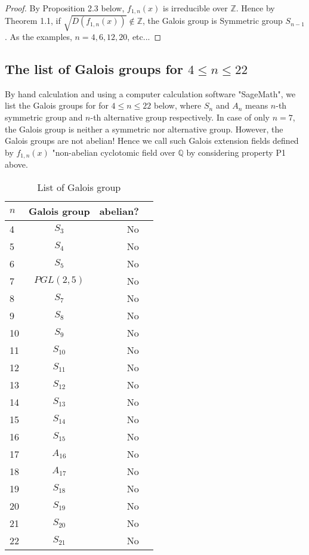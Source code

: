 \documentclass{article}
\begin{document}
\begin{proof}
By Proposition 2.3 below, $f_{1,n}(x)$ is irreducible over $\mathbb{Z}$. Hence by Theorem 1.1, if $\sqrt{D(f_{1,n}(x))}\notin\mathbb{Z}$, the Galois group is Symmetric group $S_{n-1}$. As the examples, $n=4, 6, 12, 20$, etc...
\end{proof}

\subsection{The list of Galois groups for $4 \leq n \leq 22$}
By hand calculation and using a computer calculation software "SageMath", we list the Galois groups for for $4 \leq n \leq 22$ below, where $S_{n}$ and $A_{n}$ means $n$-th symmetric group and $n$-th alternative group respectively. In case of only $n = 7$, the Galois group is neither a symmetric nor alternative group. However, the Galois groups are not abelian! Hence we call such Galois extension fields defined by $f_{1,n}(x)$ "non-abelian cyclotomic field over $\mathbb{Q}$ by considering property P1 above.
\begin{table}[htb]
\centering
\caption{List of Galois group}
  \begin{tabular}{|l|c|r|r|} \hline
    $n$ & Galois group & abelian? \\ \hline
    4 & $S_{3}$ & No \\ \hline
    5 & $S_{4}$ & No \\ \hline
    6 & $S_{5}$ & No \\ \hline
    7 & $PGL(2,5)$ & No \\ \hline
    8 & $S_{7}$ & No \\ \hline
    9 & $S_{8}$ & No \\ \hline
    10 & $S_{9}$ & No \\ \hline
    11 & $S_{10}$ & No \\ \hline
    12 & $S_{11}$ & No \\ \hline
    13 & $S_{12}$ & No \\ \hline
    14 & $S_{13}$ & No \\ \hline
    15 & $S_{14}$ & No \\ \hline
    16 & $S_{15}$ & No \\ \hline
    17 & $A_{16}$ & No \\ \hline
    18 & $A_{17}$ & No \\ \hline
    19 & $S_{18}$ & No \\ \hline
    20 & $S_{19}$ & No \\ \hline
    21 & $S_{20}$ & No \\ \hline
    22 & $S_{21}$ & No \\ \hline
  \end{tabular}
\end{table}
\end{document}
